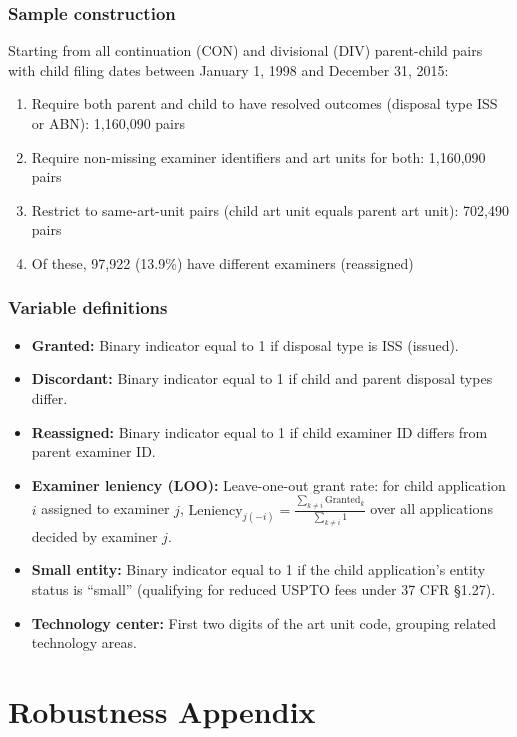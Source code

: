 \documentclass[12pt]{article}
\begin{document}
\subsubsection*{Sample construction} Starting from all continuation (CON) and divisional (DIV) parent-child pairs with child filing dates between January 1, 1998 and December 31, 2015:
\begin{enumerate}
\item Require both parent and child to have resolved outcomes (disposal type ISS or ABN): 1,160,090 pairs
\item Require non-missing examiner identifiers and art units for both: 1,160,090 pairs
\item Restrict to same-art-unit pairs (child art unit equals parent art unit): 702,490 pairs
\item Of these, 97,922 (13.9\%) have different examiners (reassigned)
\end{enumerate}

\subsubsection*{Variable definitions}
\begin{itemize}
\item \textbf{Granted:} Binary indicator equal to 1 if disposal type is ISS (issued).
\item \textbf{Discordant:} Binary indicator equal to 1 if child and parent disposal types differ.
\item \textbf{Reassigned:} Binary indicator equal to 1 if child examiner ID differs from parent examiner ID.
\item \textbf{Examiner leniency (LOO):} Leave-one-out grant rate: for child application $i$ assigned to examiner $j$, $\text{Leniency}_{j(-i)} = \frac{\sum_{k \neq i} \text{Granted}_k}{\sum_{k \neq i} 1}$ over all applications decided by examiner $j$.
\item \textbf{Small entity:} Binary indicator equal to 1 if the child application's entity status is ``small'' (qualifying for reduced USPTO fees under 37 CFR \S 1.27).
\item \textbf{Technology center:} First two digits of the art unit code, grouping related technology areas.
\end{itemize}


\section{Robustness Appendix}
\end{document}
